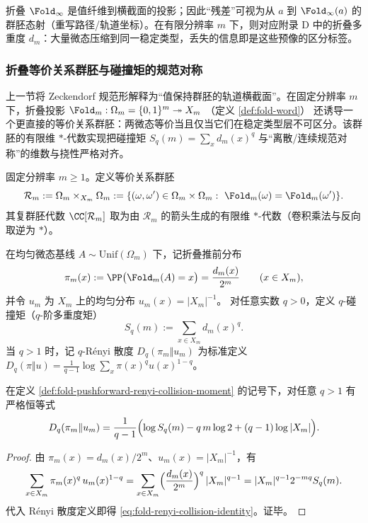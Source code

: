 \begin{remark}[残差的两种自然落点]\label{rem:residual}
折叠 $\Fold_\infty$ 是值纤维到横截面的投影；因此“残差”可视为从 $a$ 到 $\Fold_\infty(a)$ 的群胚态射（重写路径/轨道坐标）。在有限分辨率 $m$ 下，则对应附录 D 中的折叠多重度 $d_m$：大量微态压缩到同一稳定类型，丢失的信息即是这些预像的区分标签。
\end{remark}

\subsubsection{折叠等价关系群胚与碰撞矩的规范对称}\label{subsubsec:groupoid-fold-collision-gauge}
上一节将 Zeckendorf 规范形解释为“值保持群胚的轨道横截面”。在固定分辨率 \(m\) 下，折叠投影
\(\Fold_m:\Omega_m=\{0,1\}^m\twoheadrightarrow X_m\)
（定义 \ref{def:fold-word}）
还诱导一个更直接的等价关系群胚：两微态等价当且仅当它们在稳定类型层不可区分。该群胚的有限维 \(\ast\)-代数实现把碰撞矩 \(S_q(m)=\sum_x d_m(x)^q\) 与“离散/连续规范对称”的维数与挠性严格对齐。

\begin{definition}[折叠等价关系群胚与群胚代数]\label{def:fold-equivalence-groupoid-algebra}
固定分辨率 \(m\ge 1\)。定义等价关系群胚
\[
\mathcal{R}_m:=\Omega_m\times_{X_m}\Omega_m
:=\{(\omega,\omega')\in\Omega_m\times\Omega_m:\ \Fold_m(\omega)=\Fold_m(\omega')\}.
\]
其复群胚代数 \(\CC[\mathcal{R}_m]\) 取为由 \(\mathcal{R}_m\) 的箭头生成的有限维 \(\ast\)-代数（卷积乘法与反向取逆为 \(\ast\)）。
\end{definition}

\begin{definition}\label{def:fold-pushforward-renyi-collision-moment}
在均匀微态基线 \(A\sim\mathrm{Unif}(\Omega_m)\) 下，记折叠推前分布
\[
\pi_m(x):=\PP\bigl(\Fold_m(A)=x\bigr)=\frac{d_m(x)}{2^m}\qquad(x\in X_m),
\]
并令 \(u_m\) 为 \(X_m\) 上的均匀分布 \(u_m(x)=|X_m|^{-1}\)。
对任意实数 \(q>0\)，定义 \(q\)-碰撞矩（\(q\)-阶多重度矩）
\[
S_q(m):=\sum_{x\in X_m} d_m(x)^q.
\]
当 \(q>1\) 时，记 \(q\)-Rényi 散度
\(
D_q(\pi_m\Vert u_m)
\)
为标准定义
\(
D_q(\pi\Vert u)=\frac{1}{q-1}\log\sum_x \pi(x)^q u(x)^{1-q}
\)。
\end{definition}

\begin{proposition}\label{prop:fold-renyi-collision-identity}
在定义 \ref{def:fold-pushforward-renyi-collision-moment} 的记号下，对任意 \(q>1\) 有严格恒等式
\begin{equation}\label{eq:fold-renyi-collision-identity}
D_q(\pi_m\Vert u_m)
=\frac{1}{q-1}\Bigl(\log S_q(m)-q\,m\log 2+(q-1)\log|X_m|\Bigr).
\end{equation}
\end{proposition}
\begin{proof}
由 \(\pi_m(x)=d_m(x)/2^m\)、\(u_m(x)=|X_m|^{-1}\)，有
\[
\sum_{x\in X_m}\pi_m(x)^q\,u_m(x)^{1-q}
=\sum_{x\in X_m}\Bigl(\frac{d_m(x)}{2^m}\Bigr)^q\,|X_m|^{q-1}
=|X_m|^{q-1}2^{-mq}S_q(m).
\]
代入 Rényi 散度定义即得 \eqref{eq:fold-renyi-collision-identity}。证毕。
\end{proof}

